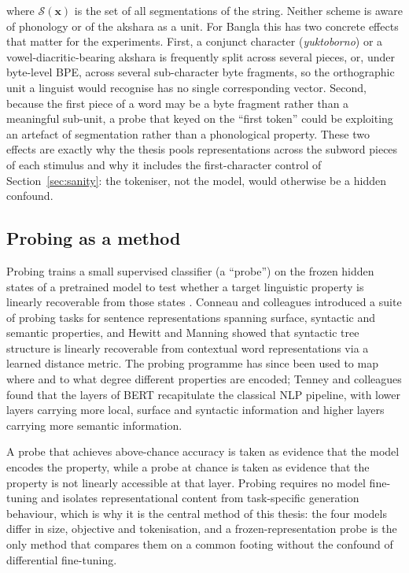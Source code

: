 where $\mathcal{S}(\mathbf{x})$ is the set of all segmentations of the string. Neither scheme is aware of phonology or of the akshara as a unit. For Bangla this has two concrete effects that matter for the experiments. First, a conjunct character (\textit{yuktoborno}) or a vowel-diacritic-bearing akshara is frequently split across several pieces, or, under byte-level BPE, across several sub-character byte fragments, so the orthographic unit a linguist would recognise has no single corresponding vector. Second, because the first piece of a word may be a byte fragment rather than a meaningful sub-unit, a probe that keyed on the ``first token'' could be exploiting an artefact of segmentation rather than a phonological property. These two effects are exactly why the thesis pools representations across the subword pieces of each stimulus and why it includes the first-character control of Section~\ref{sec:sanity}: the tokeniser, not the model, would otherwise be a hidden confound.

\subsection{Probing as a method}

Probing trains a small supervised classifier (a ``probe'') on the frozen hidden states of a pretrained model to test whether a target linguistic property is linearly recoverable from those states \cite{conneau2018probing,hewitt2019structural}. Conneau and colleagues \cite{conneau2018probing} introduced a suite of probing tasks for sentence representations spanning surface, syntactic and semantic properties, and Hewitt and Manning \cite{hewitt2019structural} showed that syntactic tree structure is linearly recoverable from contextual word representations via a learned distance metric. The probing programme has since been used to map where and to what degree different properties are encoded; Tenney and colleagues \cite{tenney2019bert} found that the layers of BERT recapitulate the classical NLP pipeline, with lower layers carrying more local, surface and syntactic information and higher layers carrying more semantic information.

A probe that achieves above-chance accuracy is taken as evidence that the model encodes the property, while a probe at chance is taken as evidence that the property is not linearly accessible at that layer. Probing requires no model fine-tuning and isolates representational content from task-specific generation behaviour, which is why it is the central method of this thesis: the four models differ in size, objective and tokenisation, and a frozen-representation probe is the only method that compares them on a common footing without the confound of differential fine-tuning.

